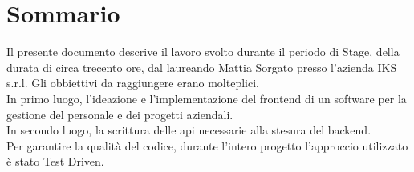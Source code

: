 
\cleardoublepage
{}
{}
\begingroup
\let\clearpage\relax
\let\cleardoublepage\relax
\let\cleardoublepage\relax

\chapter*{Sommario}

Il presente documento descrive il lavoro svolto durante il periodo di Stage, della durata di circa trecento ore, dal laureando Mattia Sorgato presso l'azienda IKS s.r.l. Gli obbiettivi da raggiungere erano molteplici.\\
In primo luogo, l'ideazione e l'implementazione del \gls{frontend} di un software per la gestione del personale e dei progetti aziendali.\\
In secondo luogo, la scrittura delle \gls{api} necessarie alla stesura del \gls{backend}.\\
Per garantire la qualità del codice, durante l'intero progetto l'approccio utilizzato è stato Test Driven.

%
%

\endgroup			

\vfill

